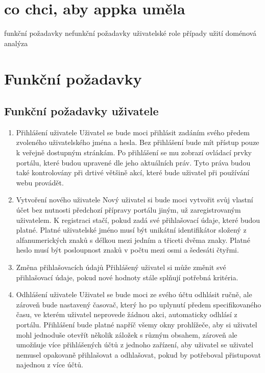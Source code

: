 \section{co chci, aby appka uměla}

funkční požadavky
nefunkční požadavky
uživatelské role
případy užití
doménová analýza

{ %
\renewcommand{\labelenumi}{F\arabic{enumi}}
\renewcommand{\labelenumii}{F\arabic{enumi}.\arabic{enumii}}
\renewcommand{\labelenumiii}{F\arabic{enumi}.\arabic{enumii}.\arabic{enumiii}}
\renewcommand{\labelenumiv}{F\arabic{enumi}.\arabic{enumii}.\arabic{enumiii}.\arabic{enumiv}}

\section{Funkční požadavky}

\subsection{Funkční požadavky uživatele}

\begin{enumerate}
\item{Přihlášení uživatele}
Uživatel se bude moci přihlásit zadáním svého předem zvoleného uživatelského jména a hesla. Bez přihlášení bude mít přístup pouze k veřejně dostupným stránkám. Po přihlášení se mu zobrazí ovládací prvky portálu, které budou upravené dle jeho aktuálních práv. Tyto práva budou také kontrolovány při drtivé většině akcí, které bude uživatel při používání webu provádět. 
\item{Vytvoření nového uživatele}
Nový uživatel si bude moci vytvořit svůj vlastní účet bez nutnosti předchozí přípravy portálu jiným, už zaregistrovaným uživatelem. K registraci stačí, pokud zadá své přihlašovací údaje, které budou platné. Platné uživatelské jméno musí být unikátní identifikátor složený z alfanumerických znaků s délkou mezi jedním a třiceti dvěma znaky. Platné heslo musí být posloupnost znaků v počtu mezi osmi a šedesáti čtyřmi.
\item{Změna přihlašovacích údajů}
Přihlášený uživatel si může změnit své přihlašovací údaje, pokud nové hodnoty stále splňují potřebná kritéria.
\item{Odhlášení uživatele}
Uživatel se bude moci ze svého účtu odhlásit ručně, ale zároveň bude nastavený časovač, který ho po uplynutí předem specifikovaného času, ve kterém uživatel neprovede žádnou akci, automaticky odhlásí z portálu. Přihlášení bude platné napříč všemy okny prohlížeče, aby si uživatel mohl jednoduše otevřít několik záložek s různým obsahem, zároveň ale umožňuje více přihlášených účtů z jednoho zařízení, aby uživatel se uživatel nemusel opakovaně přihlašovat a odhlašovat, pokud by potřeboval přistupovat najednou z více účtů.


\end{enumerate}}
